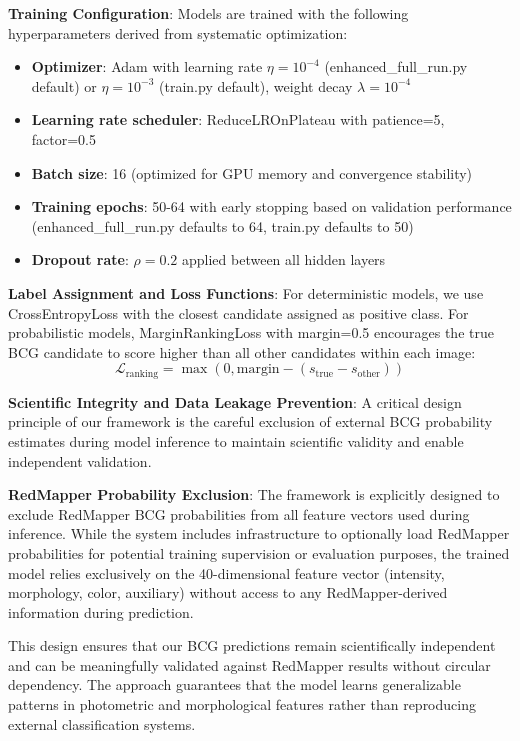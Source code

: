 \documentclass[twocolumn,10pt]{aastex631}
\begin{document}
\textbf{Training Configuration}: Models are trained with the following hyperparameters derived from systematic optimization:
\begin{itemize}
\item \textbf{Optimizer}: Adam with learning rate $\eta = 10^{-4}$ (enhanced\_full\_run.py default) or $\eta = 10^{-3}$ (train.py default), weight decay $\lambda = 10^{-4}$
\item \textbf{Learning rate scheduler}: ReduceLROnPlateau with patience=5, factor=0.5
\item \textbf{Batch size}: 16 (optimized for GPU memory and convergence stability)
\item \textbf{Training epochs}: 50-64 with early stopping based on validation performance (enhanced\_full\_run.py defaults to 64, train.py defaults to 50)
\item \textbf{Dropout rate}: $\rho = 0.2$ applied between all hidden layers
\end{itemize}

\textbf{Label Assignment and Loss Functions}: For deterministic models, we use CrossEntropyLoss with the closest candidate assigned as positive class. For probabilistic models, MarginRankingLoss with margin=0.5 encourages the true BCG candidate to score higher than all other candidates within each image:
\begin{equation}
\mathcal{L}_{\text{ranking}} = \max(0, \text{margin} - (s_{\text{true}} - s_{\text{other}}))
\end{equation}

\textbf{Scientific Integrity and Data Leakage Prevention}: A critical design principle of our framework is the careful exclusion of external BCG probability estimates during model inference to maintain scientific validity and enable independent validation.

\textbf{RedMapper Probability Exclusion}: The framework is explicitly designed to exclude RedMapper BCG probabilities \citep{Rykoff2014redMaPPer} from all feature vectors used during inference. While the system includes infrastructure to optionally load RedMapper probabilities for potential training supervision or evaluation purposes, the trained model relies exclusively on the 40-dimensional feature vector (intensity, morphology, color, auxiliary) without access to any RedMapper-derived information during prediction.

This design ensures that our BCG predictions remain scientifically independent and can be meaningfully validated against RedMapper results without circular dependency. The approach guarantees that the model learns generalizable patterns in photometric and morphological features rather than reproducing external classification systems.
\end{document}
